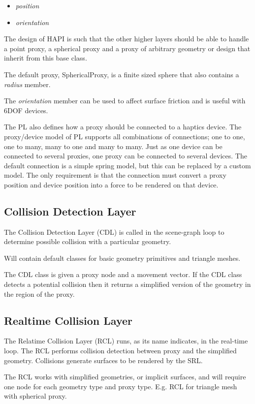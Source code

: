 \begin{itemize}
\item {\it position}
\item {\it orientation}
\end{itemize}

The design of HAPI is such that the other higher layers should be able
to handle a point proxy, a spherical proxy and a proxy of arbitrary
geometry or design that inherit from this base class.

The default proxy, SphericalProxy, is a finite sized sphere that also
contains a {\it radius} member.

The {\it orientation} member can be used to affect surface friction
and is useful with 6DOF devices.

The PL also defines how a proxy should be connected to a haptics
device. The proxy/device model of PL supports all combinations of
connections; one to one, one to many, many to one and many to
many. Just as one device can be connected to several proxies, one
proxy can be connected to several devices. The default connection is a
simple spring model, but this can be replaced by a custom model. The
only requirement is that the connection must convert a proxy position
and device position into a force to be rendered on that device.


\subsection{Collision Detection Layer}
The Collision Detection Layer (CDL) is called in the scene-graph loop
to determine possible collision with a particular geometry.

Will contain default classes for basic geometry primitives and
triangle meshes.

The CDL class is given a proxy node and a movement vector. If the CDL
class detects a potential collision then it returns a simplified
version of the geometry in the region of the proxy.


\subsection{Realtime Collision Layer}

The Relatime Collision Layer (RCL) runs, as its name indicates, in the
real-time loop. The RCL performs collision detection between proxy and
the simplified geometry. Collisions generate surfaces to be rendered
by the SRL.

The RCL works with simplified geometries, or implicit surfaces, and
will require one node for each geometry type and proxy
type. E.g. RCL for triangle mesh with spherical proxy.


